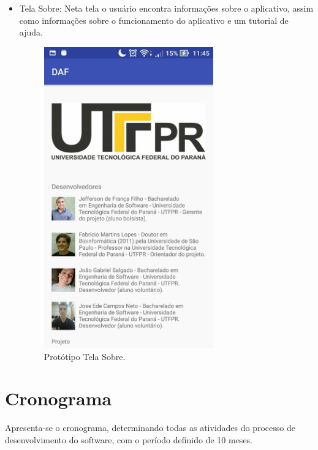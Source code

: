 \begin{itemize}
	\item  Tela Sobre: Neta tela o usu\'ario encontra informa\c{c}\~oes sobre o aplicativo, assim como informa\c{c}\~oes sobre o funcionamento do aplicativo e um tutorial de ajuda. 
	\begin{figure}[H]
		\centering
		\caption[Prot\'otipo Tela Sobre]{Prot\'otipo Tela Sobre. \label{fig:prototiposobre}}
		\includegraphics[height=13cm]{./Figuras/prototipo_sobre.jpg}%
	\end{figure}
\end{itemize}

\section{Cronograma}

Apresenta-se o cronograma, determinando todas as atividades do processo de desenvolvimento do software, com o per\'iodo definido de 10 meses. 

